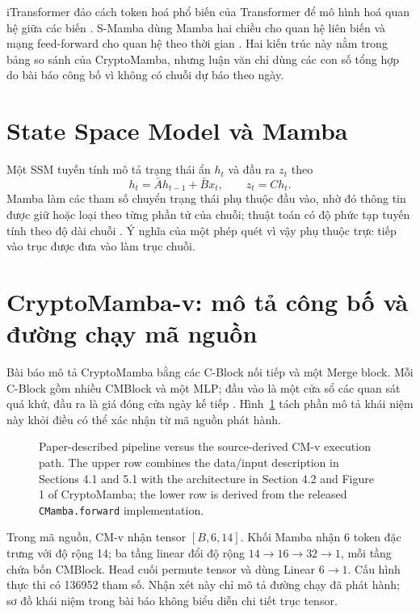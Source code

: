 \documentclass[13pt,a4paper,oneside]{report}
\begin{document}
iTransformer đảo cách token hoá phổ biến của Transformer để mô hình hoá quan hệ giữa các biến
\cite{itransformer}. S-Mamba dùng Mamba hai chiều cho quan hệ liên biến và mạng feed-forward cho
quan hệ theo thời gian \cite{smamba}. Hai kiến trúc này nằm trong bảng so sánh của CryptoMamba,
nhưng luận văn chỉ dùng các con số tổng hợp do bài báo công bố vì không có chuỗi dự báo theo ngày.

\section{State Space Model và Mamba}\label{sec:mamba}
Một SSM tuyến tính mô tả trạng thái ẩn $h_t$ và đầu ra $z_t$ theo
\begin{equation}\label{eq:ssm}
h_t=\bar{A}h_{t-1}+\bar{B}x_t, \qquad z_t=Ch_t.
\end{equation}
Mamba làm các tham số chuyển trạng thái phụ thuộc đầu vào, nhờ đó thông tin được giữ hoặc loại theo
từng phần tử của chuỗi; thuật toán có độ phức tạp tuyến tính theo độ dài chuỗi \cite{mamba}. Ý nghĩa
của một phép quét vì vậy phụ thuộc trực tiếp vào trục được đưa vào làm trục chuỗi.

\section{CryptoMamba-v: mô tả công bố và đường chạy mã nguồn}\label{sec:cmv}
Bài báo mô tả CryptoMamba bằng các C-Block nối tiếp và một Merge block. Mỗi C-Block gồm nhiều
CMBlock và một MLP; đầu vào là một cửa sổ các quan sát quá khứ, đầu ra là giá đóng cửa ngày kế tiếp
\cite{cryptomamba}. Hình~\ref{fig:paper-source-architecture} tách phần mô tả khái niệm này khỏi điều
có thể xác nhận từ mã nguồn phát hành.

\begin{figure}[H]
\centering
\resizebox{\linewidth}{!}{}
\caption[Paper diagram and released CM-v execution]{Paper-described pipeline versus the
source-derived CM-v execution path. The upper row combines the data/input description in Sections
4.1 and 5.1 with the architecture in Section 4.2 and Figure 1 of CryptoMamba; the lower row is
derived from the released \texttt{CMamba.forward} implementation.}
\label{fig:paper-source-architecture}
\end{figure}

Trong mã nguồn, CM-v nhận tensor $[B,6,14]$. Khối Mamba nhận 6 token đặc trưng với độ rộng 14; ba
tầng linear đổi độ rộng $14\to16\to32\to1$, mỗi tầng chứa bốn CMBlock. Head cuối permute tensor và
dùng Linear $6\to1$. Cấu hình thực thi có \num{136952} tham số. Nhận xét này chỉ mô tả đường chạy
đã phát hành; sơ đồ khái niệm trong bài báo không biểu diễn chi tiết trục tensor.
\end{document}
